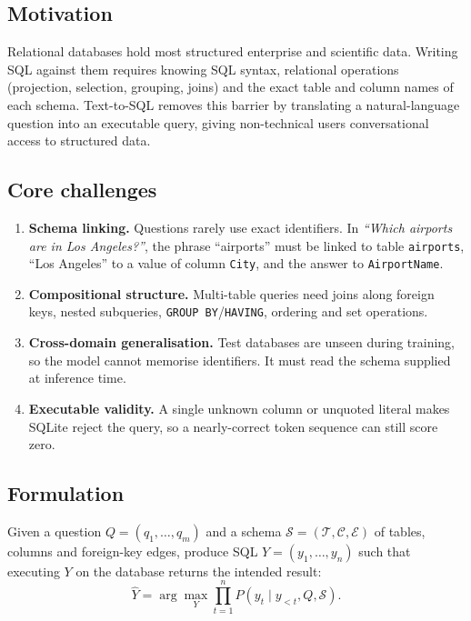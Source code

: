 \documentclass[
  10pt,
]{article}
\providecommand{\tightlist}{%
  \setlength{\itemsep}{0pt}\setlength{\parskip}{0pt}}
\begin{document}
\subsection{Motivation}\label{motivation}

Relational databases hold most structured enterprise and scientific
data. Writing SQL against them requires knowing SQL syntax, relational
operations (projection, selection, grouping, joins) and the exact table
and column names of each schema. Text-to-SQL removes this barrier by
translating a natural-language question into an executable query, giving
non-technical users conversational access to structured data.

\subsection{Core challenges}\label{core-challenges}

\begin{enumerate}
\def\labelenumi{\arabic{enumi}.}
\tightlist
\item
  \textbf{Schema linking.} Questions rarely use exact identifiers. In
  \emph{``Which airports are in Los Angeles?''}, the phrase ``airports''
  must be linked to table \texttt{airports}, ``Los Angeles'' to a value
  of column \texttt{City}, and the answer to \texttt{AirportName}.
\item
  \textbf{Compositional structure.} Multi-table queries need joins along
  foreign keys, nested subqueries, \texttt{GROUP\ BY}/\texttt{HAVING},
  ordering and set operations.
\item
  \textbf{Cross-domain generalisation.} Test databases are unseen during
  training, so the model cannot memorise identifiers. It must read the
  schema supplied at inference time.
\item
  \textbf{Executable validity.} A single unknown column or unquoted
  literal makes SQLite reject the query, so a nearly-correct token
  sequence can still score zero.
\end{enumerate}

\subsection{Formulation}\label{formulation}

Given a question \(Q=(q_1,\dots,q_m)\) and a schema
\(\mathcal{S}=(\mathcal{T},\mathcal{C},\mathcal{E})\) of tables, columns
and foreign-key edges, produce SQL \(Y=(y_1,\dots,y_n)\) such that
executing \(Y\) on the database returns the intended result:
\[\hat{Y}=\arg\max_Y \prod_{t=1}^{n} P(y_t\mid y_{<t},Q,\mathcal{S}).\]
\end{document}
